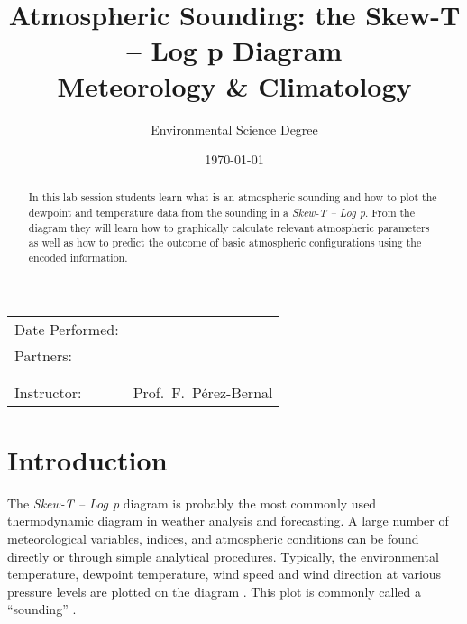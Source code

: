 \documentclass{article}
\title{\textbf{Atmospheric Sounding: the Skew-T -- Log p Diagram} \\ Meteorology
  \& Climatology} %
\author{Environmental Science Degree} %
\date{\today} %
\begin{document}
\maketitle %

\begin{center}
\begin{tabular}{l r}
Date Performed: & \underline{\hspace{3cm}}  \\ %
Partners: & \underline{\hspace{6cm}} \\ %
& \underline{\hspace{6cm}} \\
& \underline{\hspace{6cm}} \\
Instructor: & Prof.~F.~Pérez-Bernal %
\end{tabular}
\end{center}

\begin{abstract}
  In this lab session students learn what is an atmospheric sounding
  and how to plot the dewpoint and temperature data from the sounding
  in a \textit{Skew-T -- Log p}. From the diagram they will learn how to
  graphically calculate relevant atmospheric parameters as well as how
  to predict the outcome of basic atmospheric configurations using the
  encoded information.
\end{abstract}

\section{Introduction}
The \textit{Skew-T -- Log p} diagram is probably the most commonly used thermodynamic
diagram in weather analysis and forecasting. A large number of meteorological
variables, indices, and atmospheric conditions can be found directly
or through simple analytical procedures. Typically, the environmental
temperature, dewpoint temperature, wind speed and wind direction at
various pressure levels are plotted on the diagram \cite{awstr79006}. This plot is
commonly called a ``sounding'' \cite{FM-3}.
\end{document}
